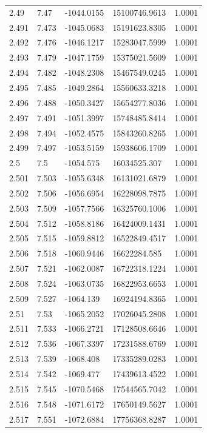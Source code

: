 \begin{tabular}{lllll}
2.49 & 7.47 & -1044.0155 & 15100746.9613 & 1.0001 \\
2.491 & 7.473 & -1045.0683 & 15191623.8305 & 1.0001 \\
2.492 & 7.476 & -1046.1217 & 15283047.5999 & 1.0001 \\
2.493 & 7.479 & -1047.1759 & 15375021.5609 & 1.0001 \\
2.494 & 7.482 & -1048.2308 & 15467549.0245 & 1.0001 \\
2.495 & 7.485 & -1049.2864 & 15560633.3218 & 1.0001 \\
2.496 & 7.488 & -1050.3427 & 15654277.8036 & 1.0001 \\
2.497 & 7.491 & -1051.3997 & 15748485.8414 & 1.0001 \\
2.498 & 7.494 & -1052.4575 & 15843260.8265 & 1.0001 \\
2.499 & 7.497 & -1053.5159 & 15938606.1709 & 1.0001 \\
2.5 & 7.5 & -1054.575 & 16034525.307 & 1.0001 \\
2.501 & 7.503 & -1055.6348 & 16131021.6879 & 1.0001 \\
2.502 & 7.506 & -1056.6954 & 16228098.7875 & 1.0001 \\
2.503 & 7.509 & -1057.7566 & 16325760.1006 & 1.0001 \\
2.504 & 7.512 & -1058.8186 & 16424009.1431 & 1.0001 \\
2.505 & 7.515 & -1059.8812 & 16522849.4517 & 1.0001 \\
2.506 & 7.518 & -1060.9446 & 16622284.585 & 1.0001 \\
2.507 & 7.521 & -1062.0087 & 16722318.1224 & 1.0001 \\
2.508 & 7.524 & -1063.0735 & 16822953.6653 & 1.0001 \\
2.509 & 7.527 & -1064.139 & 16924194.8365 & 1.0001 \\
2.51 & 7.53 & -1065.2052 & 17026045.2808 & 1.0001 \\
2.511 & 7.533 & -1066.2721 & 17128508.6646 & 1.0001 \\
2.512 & 7.536 & -1067.3397 & 17231588.6769 & 1.0001 \\
2.513 & 7.539 & -1068.408 & 17335289.0283 & 1.0001 \\
2.514 & 7.542 & -1069.477 & 17439613.4522 & 1.0001 \\
2.515 & 7.545 & -1070.5468 & 17544565.7042 & 1.0001 \\
2.516 & 7.548 & -1071.6172 & 17650149.5627 & 1.0001 \\
2.517 & 7.551 & -1072.6884 & 17756368.8287 & 1.0001 \\

\end{tabular}
